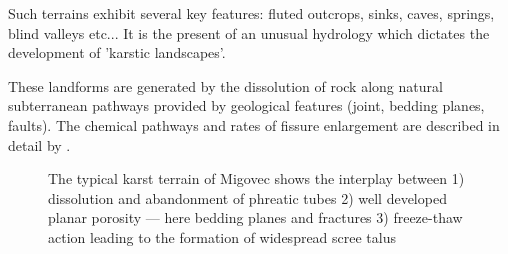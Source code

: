Such terrains exhibit several key features: fluted outcrops, sinks, caves, springs, blind valleys etc... It is the present of an unusual hydrology which dictates the development of 'karstic landscapes'. 

These landforms are generated by the dissolution of rock along natural subterranean pathways provided by geological features (joint, bedding planes, faults). The chemical pathways and rates of fissure enlargement are described in detail by \citet{dreybrodt1996principles}.

\begin{figure}[t!]
\checkoddpage \ifoddpage \forcerectofloat \else \forceversofloat \fi
{}
\caption{The typical karst terrain of Migovec shows the interplay between 1) dissolution and abandonment of phreatic tubes 2) well developed planar porosity --- here bedding planes and fractures 3) freeze-thaw action leading to the formation of widespread scree talus }
\label{fig:shaft}
\end{figure}


